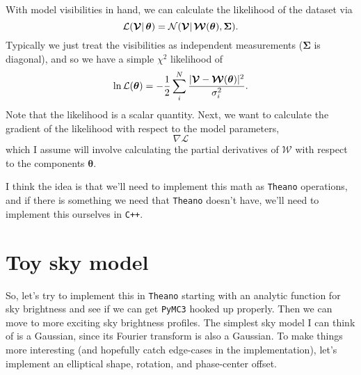 \documentclass[modern]{aastex62}
\newcommand{\vd}{\boldsymbol{\mathcal{V}}} %
\newcommand{\vm}{\boldsymbol{\mathcal{W}}} %
\newcommand{\btheta}{\boldsymbol{\theta}} %
\begin{document}
With model visibilities in hand, we can calculate the likelihood of the dataset via
\begin{equation}
    {\cal L}(\vd |\, \boldsymbol{\theta}) = {\cal N}(\boldsymbol{\mathcal{V}} |\, \boldsymbol{\mathcal{W}}(\boldsymbol{\theta}), \boldsymbol{\Sigma}).
\end{equation}
Typically we just treat the visibilities as independent measurements ($\boldsymbol{\Sigma}$ is diagonal), and so we have a simple $\chi^2$ likelihood of
\begin{equation}
    \ln {\cal L}(\btheta) = - \frac{1}{2} \sum_i^N \frac{|\vd - \vm(\btheta)|^2}{\sigma_i^2}.
\end{equation}
Note that the likelihood is a scalar quantity. Next, we want to calculate the gradient of the likelihood with respect to the model parameters,
\begin{equation}
    \nabla \mathcal{L}
\end{equation}
which I assume will involve calculating the partial derivatives of $\vm$ with respect to the components $\btheta$. 

I think the idea is that we'll need to implement this math as \texttt{Theano} operations, and if there is something we need that \texttt{Theano} doesn't have, we'll need to implement this ourselves in \texttt{C++}.

\section{Toy sky model}
So, let's try to implement this in \texttt{Theano} starting with an analytic function for sky brightness and see if we can get \texttt{PyMC3} hooked up properly. Then we can move to more exciting sky brightness profiles. The simplest sky model I can think of is a Gaussian, since its Fourier transform is also a Gaussian. To make things more interesting (and hopefully catch edge-cases in the implementation), let's implement an elliptical shape, rotation, and phase-center offset. 


\end{document}
